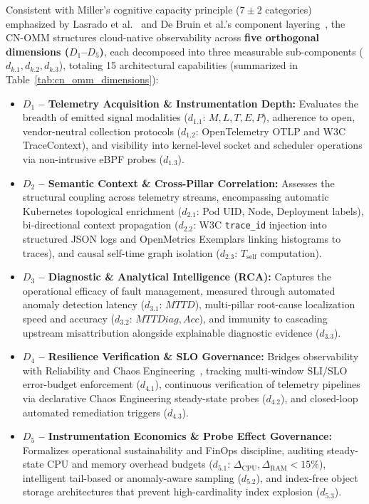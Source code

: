 Consistent with Miller's cognitive capacity principle ($7 \pm 2$ categories) emphasized by Lasrado et al.~\cite{lasrado_2015} and De Bruin et al.'s component layering~\cite{debruin_2005}, the CN-OMM structures cloud-native observability across \textbf{five orthogonal dimensions ($D_1$--$D_5$)}, each decomposed into three measurable sub-components ($d_{k.1}, d_{k.2}, d_{k.3}$), totaling 15 architectural capabilities (summarized in Table~\ref{tab:cn_omm_dimensions}):
\begin{itemize}[leftmargin=*, nosep]
    \item \textbf{$D_1$ -- Telemetry Acquisition \& Instrumentation Depth:} Evaluates the breadth of emitted signal modalities ($d_{1.1}$: $M, L, T, E, P$), adherence to open, vendor-neutral collection protocols ($d_{1.2}$: OpenTelemetry OTLP and W3C TraceContext), and visibility into kernel-level socket and scheduler operations via non-intrusive eBPF probes ($d_{1.3}$).
    \item \textbf{$D_2$ -- Semantic Context \& Cross-Pillar Correlation:} Assesses the structural coupling across telemetry streams, encompassing automatic Kubernetes topological enrichment ($d_{2.1}$: Pod UID, Node, Deployment labels), bi-directional context propagation ($d_{2.2}$: W3C \texttt{trace\_id} injection into structured JSON logs and OpenMetrics Exemplars linking histograms to traces), and causal self-time graph isolation ($d_{2.3}$: $T_{\text{self}}$ computation).
    \item \textbf{$D_3$ -- Diagnostic \& Analytical Intelligence (RCA):} Captures the operational efficacy of fault management, measured through automated anomaly detection latency ($d_{3.1}$: $MTTD$), multi-pillar root-cause localization speed and accuracy ($d_{3.2}$: $MTTDiag, Acc$), and immunity to cascading upstream misattribution alongside explainable diagnostic evidence ($d_{3.3}$).
    \item \textbf{$D_4$ -- Resilience Verification \& SLO Governance:} Bridges observability with Reliability and Chaos Engineering~\cite{basiri_2016, beyer_2016}, tracking multi-window SLI/SLO error-budget enforcement ($d_{4.1}$), continuous verification of telemetry pipelines via declarative Chaos Engineering steady-state probes ($d_{4.2}$), and closed-loop automated remediation triggers ($d_{4.3}$).
    \item \textbf{$D_5$ -- Instrumentation Economics \& Probe Effect Governance:} Formalizes operational sustainability and FinOps discipline, auditing steady-state CPU and memory overhead budgets ($d_{5.1}$: $\Delta_{\text{CPU}}, \Delta_{\text{RAM}} < 15\%$), intelligent tail-based or anomaly-aware sampling ($d_{5.2}$), and index-free object storage architectures that prevent high-cardinality index explosion ($d_{5.3}$).
\end{itemize}

